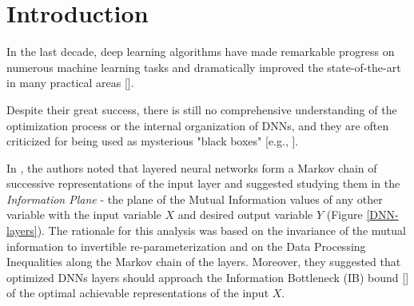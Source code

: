 \documentclass[11pt]{article}
\begin{document}
\newpage

\section{Introduction}
\label{Introduction}

In the last decade, deep learning algorithms have made remarkable progress
on numerous machine learning tasks and dramatically improved the state-of-the-art in many practical areas
 [\citet{DBLP:journals/corr/abs-1303-5778,DBLP:journals/corr/ZhangL15,DBLP:journals/corr/abs-1207-0580,DBLP:journals/corr/HeZRS15,natureDeepLeraning}].

Despite their great success, there is still no comprehensive understanding of the optimization process 
or the internal organization of DNNs, and they are often criticized for being used as mysterious "black boxes" 
[e.g., \citet{probes2016}].

In \citet{DBLP:journals/corr/TishbyZ15}, the authors noted that layered neural networks form a Markov chain of successive representations of the input layer and suggested studying them in the \textit{Information Plane} 
 - the plane of the Mutual Information values of any other variable with the input variable $X$ and desired output variable $Y$ (Figure \ref{DNN-layers}).  The rationale for this analysis was based on the invariance of the mutual information to invertible re-parameterization and on the Data Processing Inequalities along the Markov chain of the layers. Moreover, they suggested that optimized DNNs layers should approach the Information Bottleneck (IB) bound [\citet{DBLP:journals/corr/Tishby1999}] of the optimal achievable representations of the input $X$. 
\end{document}
